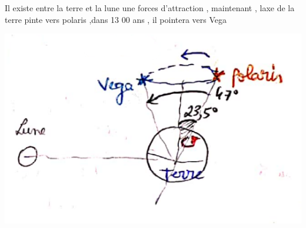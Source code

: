 \documentclass[12pt]{book}
\begin{document}
        \begin{minipage}{0.65\linewidth}
            Il existe entre la terre et la lune une forces d'attraction , maintenant , laxe de la terre pinte vers polaris ,dans 13 00 ans , il pointera vers Vega
        \end{minipage}
        \begin{minipage}{0.34\linewidth}
            \includegraphics[width=\linewidth]{pic/vega.png}
        \end{minipage}
\end{document}
